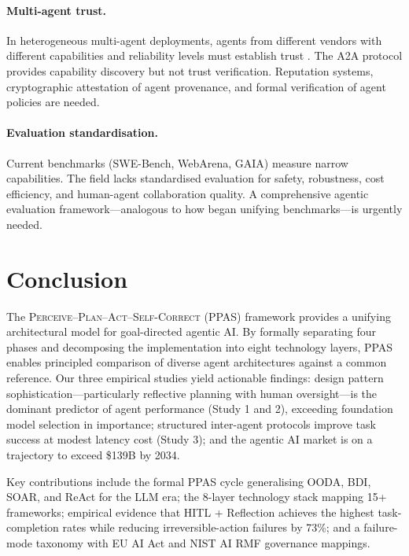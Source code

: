 \documentclass[review]{elsarticle}
\theoremstyle{definition}
\begin{document}
\paragraph{Multi-agent trust.} In heterogeneous multi-agent deployments, agents from different vendors with different capabilities and reliability levels must establish trust \citep{dorri2018multiagent}. The A2A protocol \citep{google2024a2a} provides capability discovery but not trust verification. Reputation systems, cryptographic attestation of agent provenance, and formal verification of agent policies are needed.

\paragraph{Evaluation standardisation.} Current benchmarks (SWE-Bench, WebArena, GAIA) measure narrow capabilities. The field lacks standardised evaluation for safety, robustness, cost efficiency, and human-agent collaboration quality. A comprehensive agentic evaluation framework---analogous to how \citet{liu2024agentbench} began unifying benchmarks---is urgently needed.

\section{Conclusion}\label{sec:conclusion}

The \textsc{Perceive--Plan--Act--Self-Correct} (PPAS) framework provides a unifying architectural model for goal-directed agentic AI. By formally separating four phases and decomposing the implementation into eight technology layers, PPAS enables principled comparison of diverse agent architectures against a common reference. Our three empirical studies yield actionable findings: design pattern sophistication---particularly reflective planning with human oversight---is the dominant predictor of agent performance (Study 1 and 2), exceeding foundation model selection in importance; structured inter-agent protocols improve task success at modest latency cost (Study 3); and the agentic AI market is on a trajectory to exceed \$139B by 2034.

Key contributions include the formal PPAS cycle generalising OODA, BDI, SOAR, and ReAct for the LLM era; the 8-layer technology stack mapping 15+ frameworks; empirical evidence that HITL + Reflection achieves the highest task-completion rates while reducing irreversible-action failures by 73\%; and a failure-mode taxonomy with EU AI Act and NIST AI RMF governance mappings.
\end{document}
